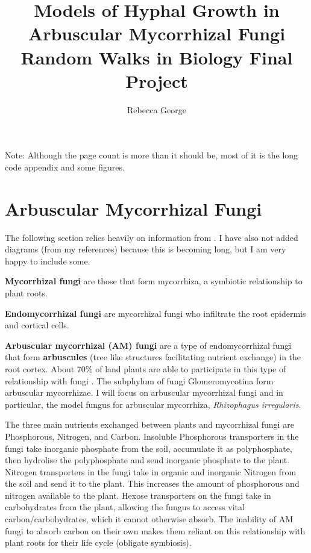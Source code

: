 \documentclass{article}
\title{%
Models of Hyphal Growth in Arbuscular Mycorrhizal Fungi \\
\large Random Walks in Biology Final Project}
\author{Rebecca George}
\begin{document}
\maketitle
\tableofcontents
Note: Although the page count is more than it should be, most of it is the long code appendix and some figures.

\section{Arbuscular Mycorrhizal Fungi}

The following section relies heavily on information from \cite{bonfante2010}. I have also not added diagrams (from my references) because this is becoming long, but I am very happy to include some.

\textbf{Mycorrhizal fungi} are those that form mycorrhiza, a symbiotic relationship to plant roots. 

\textbf{Endomycorrhizal fungi} are mycorrhizal fungi who infiltrate the root epidermis and cortical cells. 

\textbf{Arbuscular mycorrhizal (AM) fungi} are a type of endomycorrhizal fungi that form \textbf{arbuscules} (tree like structures facilitating nutrient exchange) in the root cortex. About 70\% of land plants are able to participate in this type of relationship with fungi \cite{Oyarte2025travelling}. The subphylum of fungi Glomeromycotina form arbuscular mycorrhizae. I will focus on arbuscular mycorrhizal fungi and in particular, the model fungus for arbuscular mycorrhiza, \textit{Rhizophagus irregularis}.


The three main nutrients exchanged between plants and mycorrhizal fungi are Phosphorous, Nitrogen, and Carbon. 
Insoluble Phosphorous transporters in the fungi take inorganic phosphate from the soil, accumulate it as polyphosphate, then hydrolise the polyphosphate and send inorganic phosphate to the plant. 
Nitrogen transporters in the fungi take in organic and inorganic Nitrogen from the soil and send
it to the plant.
This increases the amount of phosphorous and nitrogen available to the plant. 
Hexose transporters on the fungi take in carbohydrates from the plant, allowing the fungus to access vital carbon/carbohydrates, which it cannot otherwise absorb. The inability of AM fungi to absorb carbon on their own makes them reliant on this relationship with plant roots for their life cycle (obligate symbiosis).
\end{document}
